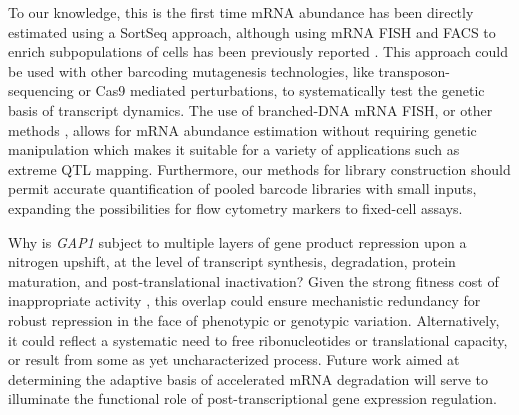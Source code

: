 To our knowledge, this is the first time mRNA abundance has
been directly estimated using a SortSeq approach, although 
using mRNA FISH and FACS to enrich subpopulations of cells has been
previously reported
\parencite{klemm2014transcriptional,hanley2013detection,sliva2016barcode}. This
approach could be used with other barcoding mutagenesis technologies,
like transposon-sequencing or Cas9 mediated perturbations, to
systematically test the genetic basis of transcript dynamics.
The use of branched-DNA mRNA FISH, or other methods
\parencite{rouhanifard2017single}, allows for mRNA abundance estimation without
requiring genetic manipulation which makes it suitable for a variety
of applications such as extreme QTL mapping. 
Furthermore, our methods for library construction should permit accurate
quantification of pooled barcode libraries with small inputs, 
expanding the possibilities for flow cytometry markers to fixed-cell assays.

Why is \textit{GAP1} subject to multiple layers of gene product repression upon
a nitrogen upshift, at the level of transcript synthesis, degradation,
protein maturation, and post-translational inactivation? Given the
strong fitness cost of inappropriate activity
\parencite{risinger2006activity},
this overlap could ensure mechanistic redundancy for robust repression in
the face of phenotypic or genotypic variation. Alternatively, it could
reflect a systematic need to free ribonucleotides or
translational capacity, or result from some as yet uncharacterized
process.
Future work aimed at determining the adaptive basis of accelerated
mRNA degradation will serve to illuminate the functional role of
post-transcriptional gene expression regulation.



